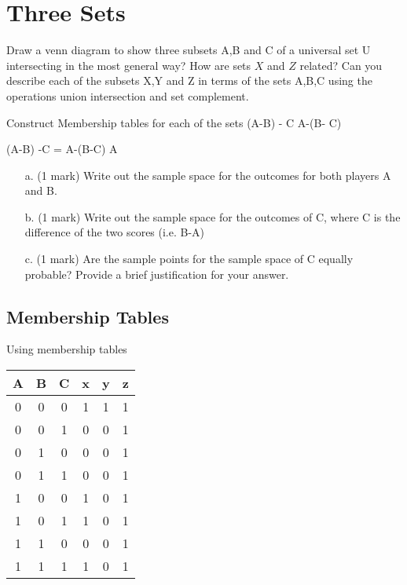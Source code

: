 \documentclass[11pt,a4paper,titlepage,oneside,openany]{article}
\numberwithin{equation}{section}
\numberwithin{algorithm}{section}
\numberwithin{figure}{section}
\numberwithin{table}{section}
\begin{document}
\section{Three Sets}
Draw a venn diagram to show three subsets A,B and C of a universal set U intersecting in the most general way?
How are sets $X$ and $Z$ related?
Can you describe each of the subsets X,Y and Z in terms  of the
sets A,B,C using the operations union intersection and set complement.

Construct Membership tables for each of the sets
(A-B) - C
A-(B- C)

(A-B) -C = A-(B-C)
A



\begin{itemize}
\item[a.] (1 mark) Write out the sample space for the outcomes for both players A and B.
\item[b.] (1 mark) Write out the sample space for the outcomes of C, where C is the difference of the two scores (i.e. B-A)
\item[c.] (1 mark) Are the sample points for the sample space of C equally probable? Provide a brief justification for your answer.
\end{itemize}


\subsection*{Membership Tables}
Using membership tables
\begin{tabular}{|ccc|c|c|c|}
  \hline
  A & B & C & x & y & z \\\hline
  0 & 0 & 0 & 1 & 1 & 1 \\
  0 & 0 & 1 & 0 & 0 & 1 \\
  0 & 1 & 0 & 0 & 0 & 1 \\
  0 & 1 & 1 & 0 & 0 & 1 \\
  1 & 0 & 0 & 1 & 0 & 1 \\
  1 & 0 & 1 & 1 & 0 & 1 \\
  1 & 1 & 0 & 0 & 0 & 1 \\
  1 & 1 & 1 & 1 & 0 & 1 \\
  \hline
\end{tabular}
\end{document}
